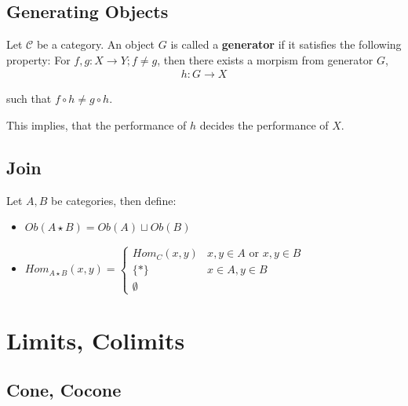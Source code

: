 \documentclass[Total.tex]{subfiles}
\begin{document}
				\subsection{Generating Objects}
					\begin{Def}
						Let $\mathcal{C}$ be a category. An object $G$ is called a \textbf{generator} if it satisfies the following property: For $f,g:X\rightarrow Y;f\not= g$, then there exists a morpism from generator $G$,
						\begin{gather*}
							h:G\rightarrow X
						\end{gather*}			
						
						such that $f\circ h\not= g\circ h$.
					\end{Def}
					
					This implies, that the performance of $h$ decides the performance of $X$.
				\subsection{Join}
					\begin{Def}
						Let $A,B$ be categories, then define:
						\begin{itemize}
							\item $Ob(A\star B)=Ob(A)\sqcup Ob(B)$
							\item $Hom_{A\star B}(x,y)=\begin{cases}
								Hom_C(x,y)&x,y\in A\mbox{ or }x,y\in B\\
								\{*\}&x\in A,y\in B\\
								\emptyset
							\end{cases}$
						\end{itemize}
					\end{Def}
			\section{Limits, Colimits}
			\subsection{Cone, Cocone}
\end{document}
